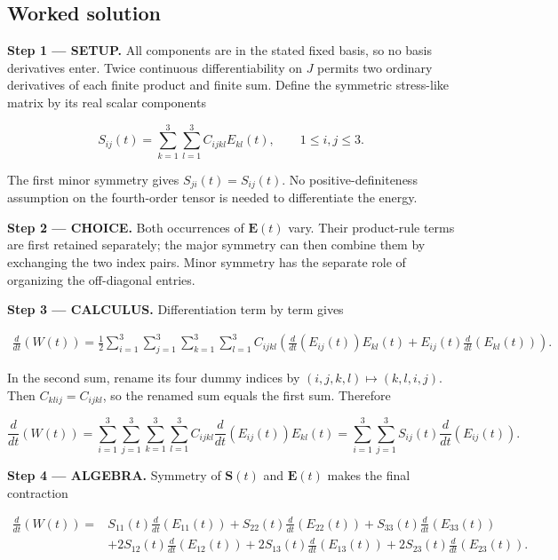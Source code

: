 \documentclass[11pt,oneside,openany]{book}
\begin{document}
\subsection*{Worked solution}

\textbf{Step 1 --- SETUP.} All components are in the stated fixed basis, so no basis derivatives enter. Twice continuous differentiability on \(J\) permits two ordinary derivatives of each finite product and finite sum. Define the symmetric stress-like matrix by its real scalar components

\[
S_{ij}(t)=\sum_{k=1}^3\sum_{l=1}^3 C_{ijkl}E_{kl}(t),\qquad 1\le i,j\le3.
\]

The first minor symmetry gives \(S_{ji}(t)=S_{ij}(t)\). No positive-definiteness assumption on the fourth-order tensor is needed to differentiate the energy.

\begin{ChoiceStep}
\textbf{Step 2 --- CHOICE.} Both occurrences of \(\mathbf E(t)\) vary. Their product-rule terms are first retained separately; the major symmetry can then combine them by exchanging the two index pairs. Minor symmetry has the separate role of organizing the off-diagonal entries.

\end{ChoiceStep}
\textbf{Step 3 --- CALCULUS.} Differentiation term by term gives

\[
\begin{aligned}
\frac{d}{dt}\left(W(t)\right)
=\frac12\sum_{i=1}^3\sum_{j=1}^3\sum_{k=1}^3\sum_{l=1}^3 C_{ijkl}
\left(
\frac{d}{dt}\left(E_{ij}(t)\right)E_{kl}(t)
+E_{ij}(t)\frac{d}{dt}\left(E_{kl}(t)\right)
\right).
\end{aligned}
\]

In the second sum, rename its four dummy indices by \((i,j,k,l)\mapsto(k,l,i,j)\). Then \(C_{klij}=C_{ijkl}\), so the renamed sum equals the first sum. Therefore

\[
\frac{d}{dt}\left(W(t)\right)
=\sum_{i=1}^3\sum_{j=1}^3\sum_{k=1}^3\sum_{l=1}^3
C_{ijkl}\frac{d}{dt}\left(E_{ij}(t)\right)E_{kl}(t)
=\sum_{i=1}^3\sum_{j=1}^3 S_{ij}(t)\frac{d}{dt}\left(E_{ij}(t)\right).
\]

\begingroup\color{AlgebraBlue}
\textbf{Step 4 --- ALGEBRA.} Symmetry of \(\mathbf S(t)\) and \(\mathbf E(t)\) makes the final contraction

\[
\begin{aligned}
\frac{d}{dt}\left(W(t)\right)
={}&S_{11}(t)\frac{d}{dt}\left(E_{11}(t)\right)
+S_{22}(t)\frac{d}{dt}\left(E_{22}(t)\right)
+S_{33}(t)\frac{d}{dt}\left(E_{33}(t)\right)\\
&+2S_{12}(t)\frac{d}{dt}\left(E_{12}(t)\right)
+2S_{13}(t)\frac{d}{dt}\left(E_{13}(t)\right)
+2S_{23}(t)\frac{d}{dt}\left(E_{23}(t)\right).
\end{aligned}
\]
\end{document}
